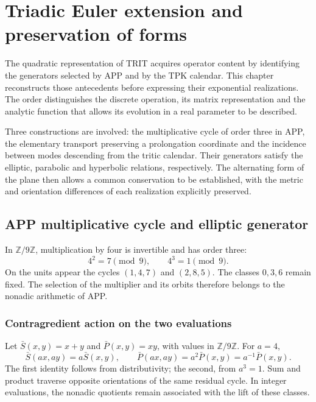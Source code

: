 \section{Triadic Euler extension and preservation of forms}
\label{eul:capitulo}

The quadratic representation of TRIT acquires operator content by
identifying the generators selected by APP and by the TPK
calendar. This chapter reconstructs those antecedents before expressing their
exponential realizations. The order distinguishes the discrete operation,
its matrix representation and the analytic function that allows its
evolution in a real parameter to be described.

Three constructions are involved: the multiplicative cycle of order three
in APP, the elementary transport preserving a prolongation
coordinate and the incidence between modes descending from the tritic
calendar. Their generators satisfy the elliptic, parabolic and hyperbolic
relations, respectively. The alternating form of the plane then allows
a common conservation to be established, with the metric
and orientation differences of each realization explicitly preserved.

\subsection{APP multiplicative cycle and elliptic generator}
\label{eul:coxeter}

In \(\mathbb Z/9\mathbb Z\), multiplication by four is invertible
and has order three:
\[
 4^2=7\pmod9,\qquad 4^3=1\pmod9.
\]
On the units appear the cycles \((1,4,7)\) and \((2,8,5)\).
The classes \(0,3,6\) remain fixed. The selection of the multiplier and its
orbits therefore belongs to the nonadic arithmetic of APP.

\subsubsection{Contragredient action on the two evaluations}

Let \(\bar S(x,y)=x+y\) and \(\bar P(x,y)=xy\), with values in
\(\mathbb Z/9\mathbb Z\). For \(a=4\),
\begin{equation}
 \bar S(ax,ay)=a\bar S(x,y),\qquad
 \bar P(ax,ay)=a^2\bar P(x,y)=a^{-1}\bar P(x,y).
\label{eul:eq:contragrediente}
\end{equation}
The first identity follows from distributivity; the second, from
\(a^3=1\). Sum and product traverse opposite orientations of the
same residual cycle. In integer evaluations, the nonadic
quotients remain associated with the lift of these classes.

